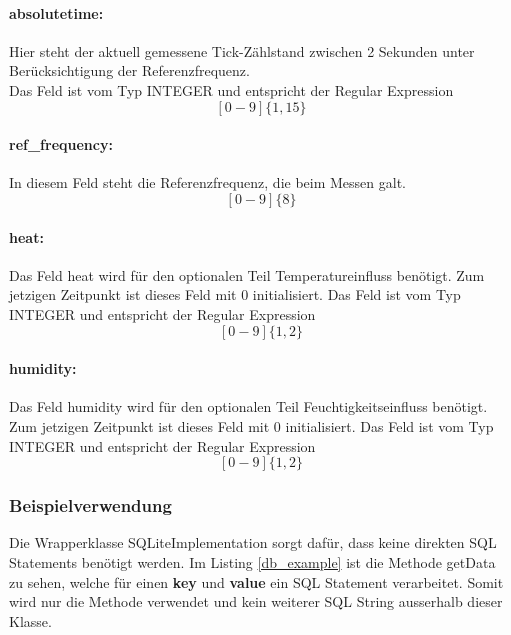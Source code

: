    \paragraph{absolutetime:}
    Hier steht der aktuell gemessene Tick-Zählstand zwischen 2 Sekunden unter Berücksichtigung der Referenzfrequenz.\\
    Das Feld ist vom Typ INTEGER und entspricht der Regular Expression
    $$[0-9]\{1,15\}$$
    \paragraph{ref\_frequency:}
    In diesem Feld steht die Referenzfrequenz, die beim Messen galt.
    $$[0-9]\{8\}$$
    \paragraph{heat:}
    Das Feld heat wird für den optionalen Teil Temperatureinfluss benötigt. Zum jetzigen Zeitpunkt ist dieses Feld mit 0 initialisiert.
    Das Feld ist vom Typ INTEGER und entspricht der Regular Expression
    $$[0-9]\{1,2\}$$
    \paragraph{humidity:}
    Das Feld humidity wird für den optionalen Teil Feuchtigkeitseinfluss benötigt. Zum jetzigen Zeitpunkt ist dieses Feld mit 0 initialisiert.
    Das Feld ist vom Typ INTEGER und entspricht der Regular Expression
    $$[0-9]\{1,2\}$$
    
    \subsubsection{Beispielverwendung}
    Die Wrapperklasse SQLiteImplementation sorgt dafür, dass keine direkten SQL Statements benötigt werden. Im Listing \ref{db_example} ist die Methode getData zu sehen, welche für einen \textbf{key} und \textbf{value} ein SQL Statement verarbeitet. Somit wird nur die Methode verwendet und kein weiterer SQL String ausserhalb dieser Klasse.
    
    